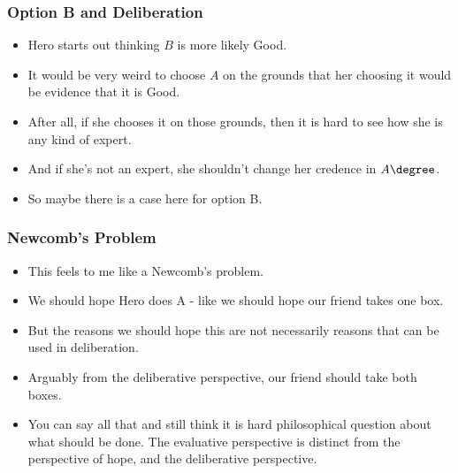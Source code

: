 \begin{frame}[fragile]
\frametitle{Option B and Deliberation}
\label{optionbanddeliberation}

\begin{itemize}
\item{} Hero starts out thinking $B$ is more likely Good.

\item{} It would be very weird to choose $A$ on the grounds that her choosing it would be evidence that it is Good.

\item{} After all, if she chooses it on those grounds, then it is hard to see how she is any kind of expert.

\item{} And if she's not an expert, she shouldn't change her credence in $A\degree$.

\item{} So maybe there is a case here for option B.

\end{itemize}

\end{frame}

\begin{frame}[fragile]
\frametitle{Newcomb's Problem}
\label{newcombsproblem}

\begin{itemize}
\item{} This feels to me like a Newcomb's problem.

\item{} We should hope Hero does A - like we should hope our friend takes one box. \pause 

\item{} But the reasons we should hope this are not necessarily reasons that can be used in deliberation.

\item{} Arguably from the deliberative perspective, our friend should take both boxes. \pause 

\item{} You can say all that and still think it is hard philosophical question about what should be done. The evaluative perspective is distinct from the perspective of hope, and the deliberative perspective.

\end{itemize}

\end{frame}

